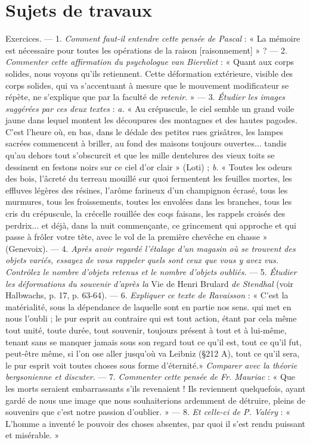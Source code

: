 {{\section{Sujets de travaux}%


Exercices. — 1. {\it Comment faut-il entendre cette pensée de Pascal} : « La
mémoire est nécessaire pour toutes les opérations de la raison [raisonnement] » ?
— 2. {\it Commenter cette affirmation du psychologue van Biervliet} :
« Quant aux corps solides, nous voyons qu'ils retiennent. Cette déformation
extérieure, visible des corps solides, qui va s’accentuant à mesure que le
mouvement modificateur se répète, ne s'explique que par la faculté de
{\it retenir}. » — 3. {\it Étudier les images suggérées par ces deux textes} : {\it a.} « Au crépuscule,
le ciel semble un grand voile jaune dans lequel montent les découpures
des montagnes et des hautes pagodes. C’est l'heure où, en bas, dans
le dédale des petites rues grisâtres, les lampes sacrées commencent à briller,
au fond des maisons toujours ouvertes... tandis qu’au dehors tout s’obscurcit
et que les mille dentelures des vieux toits se dessinent en festons
noirs sur ce ciel d’or clair » (Loti) ; {\it b.} « Toutes les odeurs des bois, l'âcreté
du terreau mouillé sur quoi fermentent les feuilles mortes, les effluves
légères des résines, l’arôme farineux d’un champignon écrasé, tous les murmures,
tous les froissements, toutes les envolées dans les branches, tous
les cris du crépuscule, la crécelle rouillée des coqs faisans, les rappels croisés
des perdrix... et déjà, dans la nuit commençante, ce grincement qui
approche et qui passe à frôler votre tête, avec le vol de la première chevêche
en chasse » (Genevoix). — 4. {\it Après avoir regardé l'étalage d’un magasin
où se trouvent des objets variés, essayez de vous rappeler quels sont ceux que
vous y avez vus. Contrôlez le nombre d'objets retenus et le nombre d'objets
oubliés}. — 5. {\it Étudier les déformations du souvenir d’après la} Vie de Henri
Brulard {\it de Stendhal} (voir Halbwachs, p. 17, p. 63-64). — 6. {\it Expliquer ce
texte de Ravaisson} : « C’est la matérialité, sous la dépendance de laquelle
sont en partie nos sens. qui met en nous l'oubli ; le pur esprit au contraire
qui est tout action, étant par cela même tout unité, toute durée, tout
souvenir, toujours présent à tout et à lui-même, tenant sans se manquer
jamais sous son regard tout ce qu’il est, tout ce qu’il fut, peut-être même,
si l’on ose aller jusqu'où va Leibniz (\S 212 A), tout ce qu'il sera, le pur
esprit voit toutes choses sous forme d’éternité.» {\it Comparer avec la
théorie bergsonienne et discuter}. — 7. {\it Commenter cette pensée de Fr. Mauriac} :
« Que les morts seraient embarrassants s’ils revenaient ! Ils reviennent
quelquefois, ayant gardé de nous une image que nous souhaiterions ardemment
de détruire, pleins de souvenirs que c’est notre passion d'oublier. »
— 8. {\it Et celle-ci de P. Valéry} : « L'homme a inventé le pouvoir des choses
absentes, par quoi il s’est rendu puissant et misérable. »

}}
